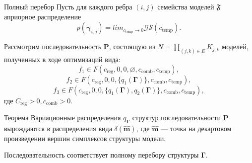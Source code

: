 \documentclass[usenames,dvipsnames,10pt,pdf,utf8,russian,aspectratio=43]{beamer}
\begin{document}
\begin{frame}{Полный перебор}
\small
Пусть для каждого ребра $(i,j)$ семейства моделей $\mathfrak{F}$ априорное распределение $$p(\boldsymbol{\gamma}_{i,j}) =  lim_{c_{\text{temp}} \to 0} \mathcal{GS}(c_{\text{temp}}).$$

Рассмотрим последовательность $\mathbf{P}$, состоящую из $N = \prod_{(j,k) \in E} K_{j,k}$ моделей, полученных в ходе оптимизаций вида:
$$f_1 \in F(c_{\text{reg}}, 0, 0, \varnothing, c_{\text{comb}},  c_{\text{temp}}),$$
$$f_2 \in F(c_{\text{reg}}, 0, 0, \{q_1(\boldsymbol{\Gamma})\},  c_{\text{comb}},  c_{\text{temp}}),$$
$$f_3 \in F(c_{\text{reg}}, 0, 0, \{q_1(\boldsymbol{\Gamma}), q_2(\boldsymbol{\Gamma})\},  c_{\text{comb}},  c_{\text{temp}}),$$
где $C_{\text{reg}} > 0,  c_{\text{comb}}>0$.


\begin{block}{Теорема}
Вариационные распределения $q_{\boldsymbol{\Gamma}}$ структур  последовательности $\mathbf{P}$ вырождаются в распределения вида $\delta(\hat{\mathbf{m}})$, где $\hat{\mathbf{m}}$ --- точка на декартовом произведении вершин симплексов структуры модели.

Последовательность соответствует полному перебору структуры $\boldsymbol{\Gamma}$.
\end{block}
\end{frame}
\fi
\end{document}
